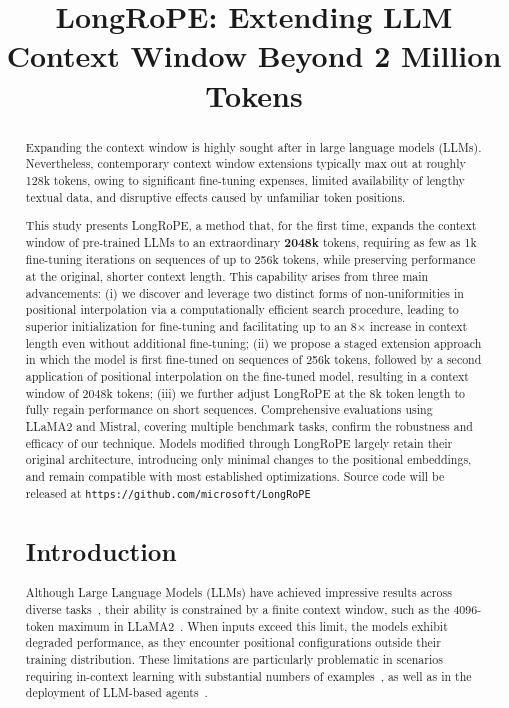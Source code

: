 \title{LongRoPE: Extending LLM Context Window Beyond 2 Million Tokens}

\begin{abstract}
Expanding the context window is highly sought after in large language models (LLMs). Nevertheless, contemporary context window extensions typically max out at roughly 128k tokens, owing to significant fine-tuning expenses, limited availability of lengthy textual data, and disruptive effects caused by unfamiliar token positions.

This study presents LongRoPE, a method that, for the first time, expands the context window of pre-trained LLMs to an extraordinary \textbf{2048k} tokens, requiring as few as 1k fine-tuning iterations on sequences of up to 256k tokens, while preserving performance at the original, shorter context length. This capability arises from three main advancements: (i) we discover and leverage two distinct forms of non-uniformities in positional interpolation via a computationally efficient search procedure, leading to superior initialization for fine-tuning and facilitating up to an 8$\times$ increase in context length even without additional fine-tuning; (ii) we propose a staged extension approach in which the model is first fine-tuned on sequences of 256k tokens, followed by a second application of positional interpolation on the fine-tuned model, resulting in a context window of 2048k tokens; (iii) we further adjust LongRoPE at the 8k token length to fully regain performance on short sequences. Comprehensive evaluations using LLaMA2 and Mistral, covering multiple benchmark tasks, confirm the robustness and efficacy of our technique. Models modified through LongRoPE largely retain their original architecture, introducing only minimal changes to the positional embeddings, and remain compatible with most established optimizations. Source code will be released at \texttt{https://github.com/microsoft/LongRoPE}

\section{Introduction}

Although Large Language Models (LLMs) have achieved impressive results across diverse tasks~\cite{gpt4,llama2}, their ability is constrained by a finite context window, such as the 4096-token maximum in LLaMA2~\cite{llama2}. When inputs exceed this limit, the models exhibit degraded performance, as they encounter positional configurations outside their training distribution. These limitations are particularly problematic in scenarios requiring in-context learning with substantial numbers of examples~\cite{Huang2023FewerIM}, as well as in the deployment of LLM-based agents~\cite{park2023generative,madaan2023selfrefine}.


\end{abstract}
